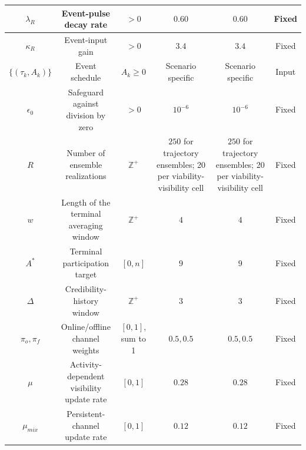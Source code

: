 \documentclass[11pt]{article}
\begin{document}
\begin{longtable}[c]{|c|c|c|c|c|c|}
         \hline
         $\lambda_R$&  \makecell{Event-pulse\\decay rate}&  $>0$&  $0.60$&  $0.60$& Fixed\\
         \hline
         $\kappa_R$&  \makecell{Event-input\\gain}&  $>0$&  $3.4$&  $3.4$& Fixed\\
         \hline
         $\{(\tau_k,A_k)\}$&  \makecell{Event\\schedule}&  $A_k\ge0$&  \makecell{Scenario\\specific}&  \makecell{Scenario\\specific}& Input\\
         \hline
         $\epsilon_0$&  \makecell{Safeguard against\\division by zero}&  $>0$&  $10^{-6}$&  $10^{-6}$& Fixed\\
         \hline
         $R$&  \makecell{Number of\\ensemble realizations}&  $\mathbb{Z}^+$&  \makecell{$250$ for trajectory\\ensembles; 20 per\\viability-visibility cell}&  \makecell{$250$ for trajectory\\ensembles; 20 per\\viability-visibility cell}& Fixed\\
         \hline
         $w$&  \makecell{Length of the\\terminal averaging\\window}&  $\mathbb{Z}^+$&  $4$&  $4$& Fixed\\
         \hline
         $A^*$&  \makecell{Terminal\\participation target}&  $[0, n]$&  $9$&  $9$& Fixed\\
         \hline
         $\Delta$&  \makecell{Credibility-history\\window}&  $\mathbb{Z}^+$&  $3$&  $3$& Fixed\\
         \hline
         $\pi_o,\pi_f$&  \makecell{Online/offline\\channel weights}&  \makecell{$[0, 1]$,\\sum to 1}&  $0.5, 0.5$&  $0.5, 0.5$& Fixed\\
         \hline
         $\mu$&  \makecell{Activity-dependent\\visibility update rate}&  $[0,1]$&  $0.28$&  $0.28$& Fixed\\
         \hline
         $\mu_{mix}$&  \makecell{Persistent-channel\\update rate}&  $[0,1]$&  $0.12$&  $0.12$& Fixed\\

\end{longtable}
\end{document}
